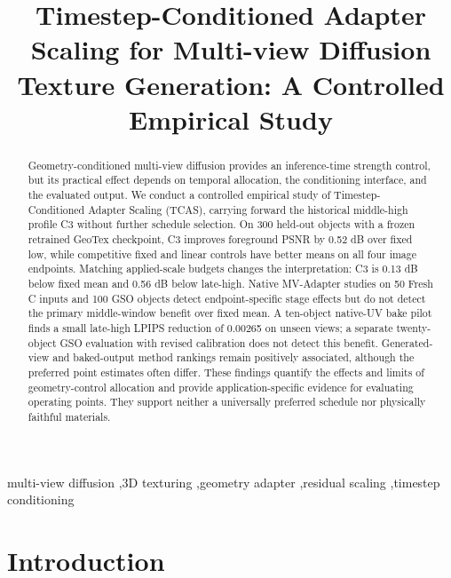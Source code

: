 \documentclass[times,twocolumn,final]{elsarticle}
\begin{document}
\begin{frontmatter}

\title{Timestep-Conditioned Adapter Scaling for Multi-view Diffusion Texture Generation: A Controlled Empirical Study}


\begin{abstract}
Geometry-conditioned multi-view diffusion provides an inference-time strength control, but its practical effect depends on temporal allocation, the conditioning interface, and the evaluated output. We conduct a controlled empirical study of Timestep-Conditioned Adapter Scaling (TCAS), carrying forward the historical middle-high profile C3 without further schedule selection. On 300 held-out objects with a frozen retrained GeoTex checkpoint, C3 improves foreground PSNR by 0.52 dB over fixed low, while competitive fixed and linear controls have better means on all four image endpoints. Matching applied-scale budgets changes the interpretation: C3 is 0.13 dB below fixed mean and 0.56 dB below late-high. Native MV-Adapter studies on 50 Fresh C inputs and 100 GSO objects detect endpoint-specific stage effects but do not detect the primary middle-window benefit over fixed mean. A ten-object native-UV bake pilot finds a small late-high LPIPS reduction of 0.00265 on unseen views; a separate twenty-object GSO evaluation with revised calibration does not detect this benefit. Generated-view and baked-output method rankings remain positively associated, although the preferred point estimates often differ. These findings quantify the effects and limits of geometry-control allocation and provide application-specific evidence for evaluating operating points. They support neither a universally preferred schedule nor physically faithful materials.
\end{abstract}

\begin{keyword}
\KWD
multi-view diffusion \sep 3D texturing \sep geometry adapter \sep residual scaling \sep timestep conditioning
\end{keyword}

\end{frontmatter}

\raggedbottom
\linenumbers

\section{Introduction}
\label{sec:intro}
\end{document}
